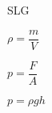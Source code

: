 \documentclass[11pt,a4paper]{article}
\begin{document}
\vspace*{1em}

\hrulefill

\vspace*{1em}

\noindent\begin{paracol}{4}
SLG
\switchcolumn 
\begin{center}
$\rho = \dfrac{m}{V}$
\end{center}
\switchcolumn
\begin{center}
$p=\dfrac{F}{A}$
\end{center}
\switchcolumn
\begin{center}
$p=\rho g h$
\end{center}
\end{paracol}

\vfill
\end{document}
